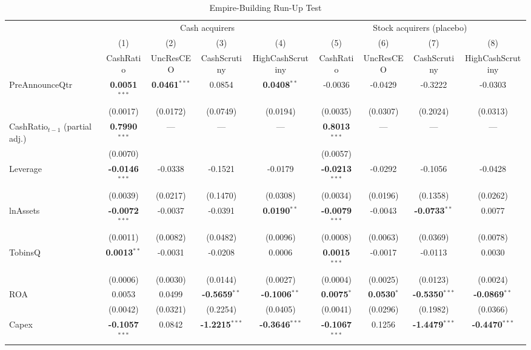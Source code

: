 \begin{table}[htbp]
\centering
\caption{Empire-Building Run-Up Test}
\label{tab:empire_building_did}
\scriptsize
\begin{tabular}{lcccccccc}
\toprule
 & \multicolumn{4}{c}{Cash acquirers} & \multicolumn{4}{c}{Stock acquirers (placebo)} \\
\cmidrule(lr){2-5}\cmidrule(lr){6-9}
 & (1) & (2) & (3) & (4) & (5) & (6) & (7) & (8) \\
 & CashRatio & UncResCEO & CashScrutiny & HighCashScrutiny & CashRatio & UncResCEO & CashScrutiny & HighCashScrutiny \\
\midrule
PreAnnounceQtr & \textbf{0.0051}$^{***}$ & \textbf{0.0461}$^{***}$ & 0.0854 & \textbf{0.0408}$^{**}$ & -0.0036 & -0.0429 & -0.3222 & -0.0303 \\
 & (0.0017) & (0.0172) & (0.0749) & (0.0194) & (0.0035) & (0.0307) & (0.2024) & (0.0313) \\
CashRatio$_{t-1}$ (partial adj.) & \textbf{0.7990}$^{***}$ & --- & --- & --- & \textbf{0.8013}$^{***}$ & --- & --- & --- \\
 & (0.0070) &  &  &  & (0.0057) &  &  &  \\
\midrule
Leverage & \textbf{-0.0146}$^{***}$ & -0.0338 & -0.1521 & -0.0179 & \textbf{-0.0213}$^{***}$ & -0.0292 & -0.1056 & -0.0428 \\
 & (0.0039) & (0.0217) & (0.1470) & (0.0308) & (0.0034) & (0.0196) & (0.1358) & (0.0262) \\
lnAssets & \textbf{-0.0072}$^{***}$ & -0.0037 & -0.0391 & \textbf{0.0190}$^{**}$ & \textbf{-0.0079}$^{***}$ & -0.0043 & \textbf{-0.0733}$^{**}$ & 0.0077 \\
 & (0.0011) & (0.0082) & (0.0482) & (0.0096) & (0.0008) & (0.0063) & (0.0369) & (0.0078) \\
TobinsQ & \textbf{0.0013}$^{**}$ & -0.0031 & -0.0208 & 0.0006 & \textbf{0.0015}$^{***}$ & -0.0017 & -0.0113 & 0.0030 \\
 & (0.0006) & (0.0030) & (0.0144) & (0.0027) & (0.0004) & (0.0025) & (0.0123) & (0.0024) \\
ROA & 0.0053 & 0.0499 & \textbf{-0.5659}$^{**}$ & \textbf{-0.1006}$^{**}$ & \textbf{0.0075}$^{*}$ & \textbf{0.0530}$^{*}$ & \textbf{-0.5350}$^{***}$ & \textbf{-0.0869}$^{**}$ \\
 & (0.0042) & (0.0321) & (0.2254) & (0.0405) & (0.0041) & (0.0296) & (0.1982) & (0.0366) \\
Capex & \textbf{-0.1057}$^{***}$ & 0.0842 & \textbf{-1.2215}$^{***}$ & \textbf{-0.3646}$^{***}$ & \textbf{-0.1067}$^{***}$ & 0.1256 & \textbf{-1.4479}$^{***}$ & \textbf{-0.4470}$^{***}$ \\

\end{tabular}
\end{table}
